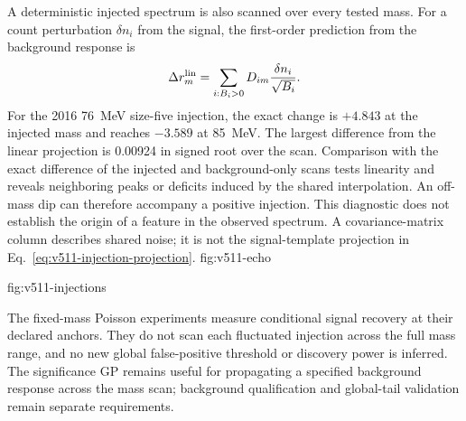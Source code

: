 A deterministic injected spectrum is also scanned over every tested mass.
For a count perturbation $\delta n_i$ from the signal, the first-order
prediction from the background response is
\begin{equation}
 \Delta r_m^{\rm lin}=\sum_{i:B_i>0}D_{im}
                         \frac{\delta n_i}{\sqrt{B_i}}.
 \label{eq:v511-injection-projection}
\end{equation}
For the 2016 76~MeV size-five injection, the exact change is $+4.843$
at the injected mass and reaches $-3.589$ at 85~MeV. The largest difference
from the linear projection is 0.00924 in signed root over the scan.
Comparison with the exact difference of the injected and background-only
scans tests linearity and reveals neighboring peaks or deficits induced by
the shared interpolation. An off-mass dip can therefore accompany a
positive injection. This diagnostic does not establish the origin of a
feature in the observed spectrum. A covariance-matrix column describes
shared noise; it is not the signal-template projection in
Eq.~\ref{eq:v511-injection-projection}.
{fig:v511-echo}
\FloatBarrier

{fig:v511-injections}
\FloatBarrier

The fixed-mass Poisson experiments measure conditional signal recovery
at their declared anchors. They do not scan each fluctuated injection
across the full mass range, and no new global false-positive threshold or
discovery power is inferred. The significance GP remains useful for
propagating a specified background response across the mass scan;
background qualification and global-tail validation remain separate
requirements.
\FloatBarrier
